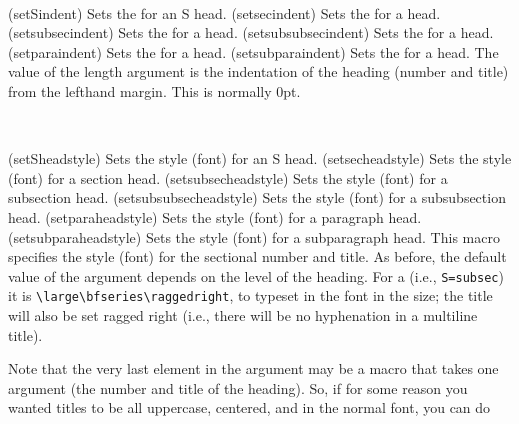\begin{syntax}
\cmd{\setSindent} \\
\end{syntax}
\glossary(setSindent)
  {}%
  {Sets the  for an S head.}
\glossary(setsecindent)
  {}%
  {Sets the  for a  head.}
\glossary(setsubsecindent)
  {}%
  {Sets the  for a  head.}
\glossary(setsubsubsecindent)
  {}%
  {Sets the  for a  head.}
\glossary(setparaindent)
  {}%
  {Sets the  for a  head.}
\glossary(setsubparaindent)
  {}%
  {Sets the  for a  head.}
The value of the  length argument is the indentation of
the heading (number and title) from the lefthand margin.
This is normally 0pt.

\begin{syntax}
\cmd{\setSheadstyle} \\
\end{syntax}
\glossary(setSheadstyle)%
  {}%
  {Sets the style (font) for an S head.}
\glossary(setsecheadstyle)%
  {}%
  {Sets the style (font) for a section head.}
\glossary(setsubsecheadstyle)%
  {}%
  {Sets the style (font) for a subsection head.}
\glossary(setsubsubsecheadstyle)%
  {}%
  {Sets the style (font) for a subsubsection head.}
\glossary(setparaheadstyle)%
  {}%
  {Sets the style (font) for a paragraph head.}
\glossary(setsubparaheadstyle)%
  {}%
  {Sets the style (font) for a subparagraph head.}
This macro specifies the style (font) for the sectional number and title.
As before, the default value of the  argument depends on the
level of the heading. For a \cmd{\subsection} (i.e., \verb?S=subsec?) it is
\verb?\large\bfseries\raggedright?, to typeset in the \cmd{\bfseries} font
in the \cmd{\large} size; the title will also be set ragged right (i.e.,
there will be no hyphenation in a multiline title).

    Note that the very last element in the  argument may be a
macro that takes one argument (the number and title of the heading). So,
if for some reason you wanted \cmd{\subsubsection} titles to be all uppercase,
centered, and in the normal font, you can do
\begin{lcode}
\setsubsubsecheadstyle{\normalfont\centering\MakeUppercase}
\end{lcode}

